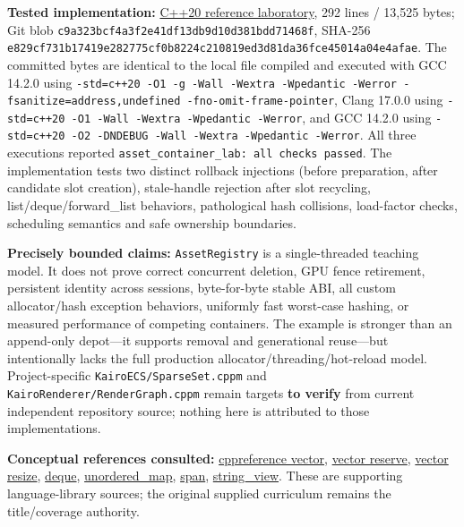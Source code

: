 \textbf{Tested implementation:} \hyperref[source-file-e829cf731b17419e282775cf]{C++20 reference laboratory}, 292 lines / 13,525 bytes; Git blob \texttt{c9a323bcf4a3f2e41df13db9d10d381bdd71468f}, SHA-256 \texttt{e829cf731b17419e282775cf0b8224c210819ed3d81da36fce45014a04e4afae}. The committed bytes are identical to the local file compiled and executed with GCC 14.2.0 using \texttt{-std=c++20\ -O1\ -g\ -Wall\ -Wextra\ -Wpedantic\ -Werror\ -fsanitize=address,undefined\ -fno-omit-frame-pointer}, Clang 17.0.0 using \texttt{-std=c++20\ -O1\ -Wall\ -Wextra\ -Wpedantic\ -Werror}, and GCC 14.2.0 using \texttt{-std=c++20\ -O2\ -DNDEBUG\ -Wall\ -Wextra\ -Wpedantic\ -Werror}. All three executions reported \texttt{asset\_container\_lab:\ all\ checks\ passed}. The implementation tests two distinct rollback injections (before preparation, after candidate slot creation), stale-handle rejection after slot recycling, list/deque/forward\_list behaviors, pathological hash collisions, load-factor checks, scheduling semantics and safe ownership boundaries.

\textbf{Precisely bounded claims:} \texttt{AssetRegistry} is a single-threaded teaching model. It does not prove correct concurrent deletion, GPU fence retirement, persistent identity across sessions, byte-for-byte stable ABI, all custom allocator/hash exception behaviors, uniformly fast worst-case hashing, or measured performance of competing containers. The example is stronger than an append-only depot---it supports removal and generational reuse---but intentionally lacks the full production allocator/threading/hot-reload model. Project-specific \texttt{KairoECS/SparseSet.cppm} and \texttt{KairoRenderer/RenderGraph.cppm} remain targets \textbf{to verify} from current independent repository source; nothing here is attributed to those implementations.

\textbf{Conceptual references consulted:} \href{https://en.cppreference.com/w/cpp/container/vector}{cppreference vector}, \href{https://en.cppreference.com/cpp/container/vector/reserve}{vector reserve}, \href{https://en.cppreference.com/cpp/container/vector/resize}{vector resize}, \href{https://en.cppreference.com/w/cpp/container/deque}{deque}, \href{https://en.cppreference.com/cpp/container/unordered_map}{unordered\_map}, \href{https://en.cppreference.com/w/cpp/container/span}{span}, \href{https://en.cppreference.com/w/cpp/string/basic_string_view}{string\_view}. These are supporting language-library sources; the original supplied curriculum remains the title/coverage authority.

